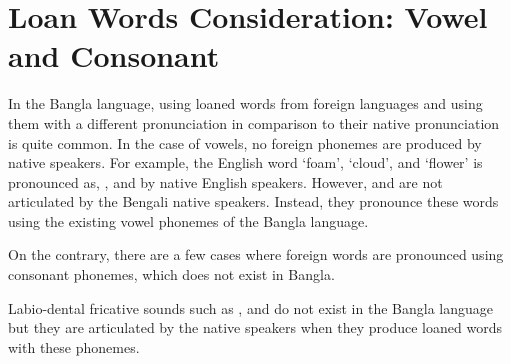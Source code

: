 \section{Loan Words Consideration: Vowel and Consonant}
In the Bangla language, using loaned words from foreign languages and using them with a different pronunciation in comparison to their native pronunciation is quite common. In the case of vowels, no foreign phonemes are produced by native speakers. For example, the English word ‘foam’, ‘cloud’, and ‘flower’ is pronounced as, , and  by native English speakers. However,  and  are not articulated by the Bengali native speakers. Instead, they pronounce these words using the existing vowel phonemes of the Bangla language.

\vspace{5mm}

On the contrary, there are a few cases where foreign words are pronounced using consonant phonemes, which does not exist in Bangla.

\begin{table}[!htbp]
    \centering
    \caption{Trancription of foreign words.}
\end{table}

Labio-dental fricative sounds such as , and  do not exist in the Bangla language but they are articulated by the native speakers when they produce loaned words with these phonemes.

